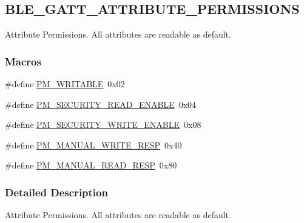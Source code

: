 \hypertarget{group___b_l_e___g_a_t_t___a_t_t_r_i_b_u_t_e___p_e_r_m_i_s_s_i_o_n_s}{}\subsection{B\+L\+E\+\_\+\+G\+A\+T\+T\+\_\+\+A\+T\+T\+R\+I\+B\+U\+T\+E\+\_\+\+P\+E\+R\+M\+I\+S\+S\+I\+O\+NS}
\label{group___b_l_e___g_a_t_t___a_t_t_r_i_b_u_t_e___p_e_r_m_i_s_s_i_o_n_s}


Attribute Permissions. All attributes are readable as default.  


\subsubsection*{Macros}
\begin{DoxyCompactItemize}
\item 
\#define \hyperlink{group___b_l_e___g_a_t_t___a_t_t_r_i_b_u_t_e___p_e_r_m_i_s_s_i_o_n_s_ga80efb1db8c2abd9e7f623354638d1599}{P\+M\+\_\+\+W\+R\+I\+T\+A\+B\+LE}~0x02
\item 
\#define \hyperlink{group___b_l_e___g_a_t_t___a_t_t_r_i_b_u_t_e___p_e_r_m_i_s_s_i_o_n_s_ga52213715707db962ca6f460ea713934c}{P\+M\+\_\+\+S\+E\+C\+U\+R\+I\+T\+Y\+\_\+\+R\+E\+A\+D\+\_\+\+E\+N\+A\+B\+LE}~0x04
\item 
\#define \hyperlink{group___b_l_e___g_a_t_t___a_t_t_r_i_b_u_t_e___p_e_r_m_i_s_s_i_o_n_s_ga0ae00cfc114463bef17cad9fd67bd912}{P\+M\+\_\+\+S\+E\+C\+U\+R\+I\+T\+Y\+\_\+\+W\+R\+I\+T\+E\+\_\+\+E\+N\+A\+B\+LE}~0x08
\item 
\#define \hyperlink{group___b_l_e___g_a_t_t___a_t_t_r_i_b_u_t_e___p_e_r_m_i_s_s_i_o_n_s_ga0df749e036782d20584ad3bd88819bfa}{P\+M\+\_\+\+M\+A\+N\+U\+A\+L\+\_\+\+W\+R\+I\+T\+E\+\_\+\+R\+E\+SP}~0x40
\item 
\#define \hyperlink{group___b_l_e___g_a_t_t___a_t_t_r_i_b_u_t_e___p_e_r_m_i_s_s_i_o_n_s_ga3ff2ad455321a532f5284a00a3f6b8e8}{P\+M\+\_\+\+M\+A\+N\+U\+A\+L\+\_\+\+R\+E\+A\+D\+\_\+\+R\+E\+SP}~0x80
\end{DoxyCompactItemize}


\subsubsection{Detailed Description}
Attribute Permissions. All attributes are readable as default. 



